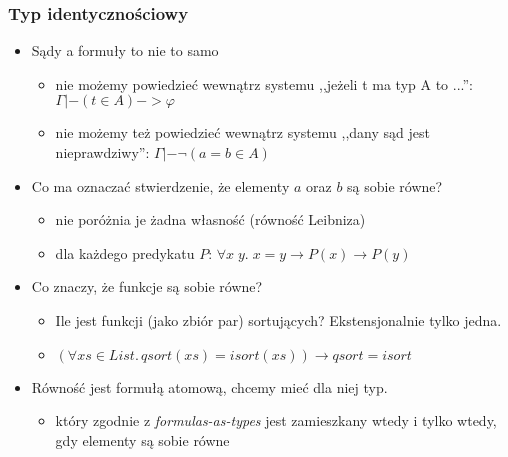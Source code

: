 \documentclass{beamer}
\begin{document}
\begin{frame}
\frametitle{Typ identycznościowy}

\begin{itemize}
\item Sądy a formuły to nie to samo
\begin{itemize}
\item nie możemy powiedzieć wewnątrz systemu ,,jeżeli t ma typ A to ...'': $\Gamma |- (t \in A) -> \varphi$
\item nie możemy też powiedzieć wewnątrz systemu ,,dany sąd jest nieprawdziwy'': $\Gamma |- \neg (a = b \in A)$
\end{itemize}

\pause
\item Co ma oznaczać stwierdzenie, że elementy $a$ oraz $b$ są sobie równe?
\begin{itemize}
\item nie poróżnia je żadna własność (równość Leibniza)
\item dla każdego predykatu $P$: $\forall x\; y.\;  x=y \to P(x) \to P(y)$
\end{itemize}
\pause
\item Co znaczy, że funkcje są sobie równe?
\begin{itemize}
\item Ile jest funkcji (jako zbiór par) sortujących? Ekstensjonalnie tylko jedna.
\item $(\forall xs \in List.\,qsort(xs) = isort(xs)) \to qsort = isort$
\end{itemize}
\pause
\item Równość jest formułą atomową, chcemy mieć dla niej typ.
\begin{itemize}
\item który zgodnie z \emph{formulas-as-types} jest zamieszkany wtedy i tylko wtedy, gdy elementy są sobie równe
\end{itemize}

\end{itemize}

\end{frame}

\end{document}

